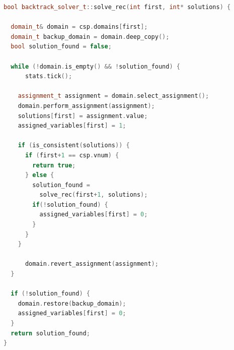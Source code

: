 \documentclass[10pt, a4paper]{article}
\begin{document}
\begin{lstlisting}[language=C++, caption=Funzione \texttt{solve\_rec} per la risoluzione \textit{backtrack}, label=lst:backtrack]
bool backtrack_solver_t::solve_rec(int first, int* solutions) {
     
  domain_t& domain = csp.domains[first];
  domain_t backup_domain = domain.deep_copy();
  bool solution_found = false;

  while (!domain.is_empty() && !solution_found) {
	  stats.tick();

    assignment_t assignment = domain.select_assignment();
    domain.perform_assignment(assignment);
    solutions[first] = assignment.value;
    assigned_variables[first] = 1;

    if (is_consistent(solutions)) {
      if (first+1 == csp.vnum) {
        return true;
      } else {
        solution_found = 
          solve_rec(first+1, solutions);
        if(!solution_found) {
          assigned_variables[first] = 0;
        }
      }
    }
	
	  domain.revert_assignment(assignment);
  }

  if (!solution_found) {
    domain.restore(backup_domain);
    assigned_variables[first] = 0;
  }
  return solution_found;
}
\end{lstlisting}
\end{document}

